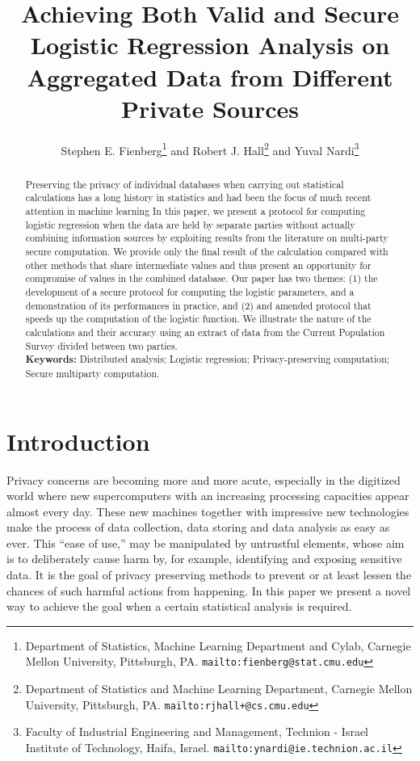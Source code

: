\documentclass[11pt]{article}
\title{Achieving Both Valid and Secure Logistic Regression Analysis on Aggregated Data from Different Private Sources}
\author{Stephen E. Fienberg\thanks{Department of Statistics, Machine Learning Department and Cylab, Carnegie Mellon University, Pittsburgh, PA. \tt{mailto:fienberg@stat.cmu.edu}} \hspace{3pt}and Robert J. Hall\thanks{Department of Statistics and Machine Learning Department, Carnegie Mellon University, Pittsburgh, PA. \tt{mailto:rjhall+@cs.cmu.edu}} \hspace{1pt}    and Yuval Nardi\thanks{Faculty of Industrial Engineering and Management, Technion - Israel Institute of Technology, Haifa, Israel. \tt{mailto:ynardi@ie.technion.ac.il}}}
\date{}
\begin{document}
\maketitle

\begin{abstract}
Preserving the privacy of individual databases when carrying out statistical calculations has a long history in statistics and had been the focus of much recent attention in machine learning  In this paper, we present a protocol for computing logistic regression when the data are held by separate parties without actually combining information sources by exploiting results from the literature on multi-party secure computation.  We provide only the final result of the calculation compared with other methods that share intermediate values and thus present an opportunity for compromise of values in the combined database.  Our paper has two themes:  (1) the development of a secure protocol for computing the logistic parameters, and a demonstration of its performances in practice, and (2) and amended protocol  that speeds up the computation of the logistic function.   We  illustrate the nature of the calculations and their accuracy using an extract of data from the Current Population Survey divided between two parties.\\


{\bf Keywords:}  Distributed analysis; Logistic regression; Privacy-preserving computation; Secure multiparty computation.

\end{abstract}


\section{Introduction}

Privacy concerns are becoming more and more acute, especially in the digitized world where new supercomputers with an increasing processing capacities appear almost every day. These new machines together with impressive new technologies make the process of data collection, data storing and data analysis as easy as ever. This ``ease of use,'' may be manipulated by untrustful elements, whose aim is to deliberately cause harm by, for example, identifying and exposing sensitive data. It is the goal of privacy preserving methods to prevent or at least  lessen the chances of such harmful actions from happening. In this paper we present a novel way to achieve the goal when a certain statistical analysis is required.
\end{document}
